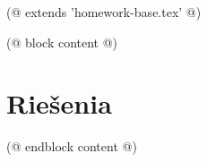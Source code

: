 (@ extends 'homework-base.tex' @)

(@ block content @)
    
    \newpage
    \section{Riešenia}
    
(@ endblock content @)
